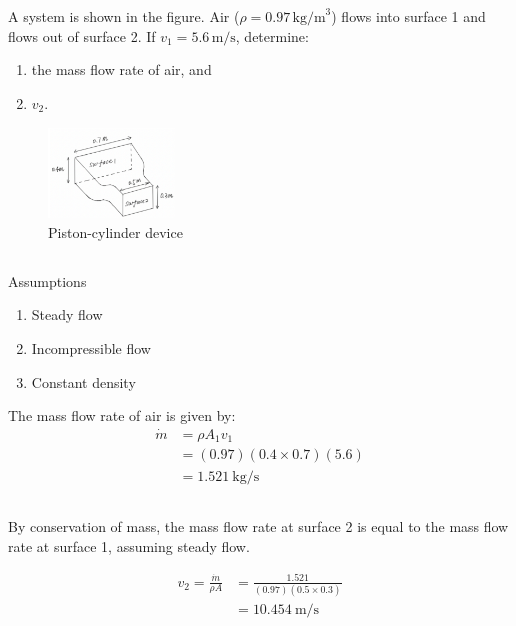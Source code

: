 \section{}
A system is shown in the figure. Air (\(\rho = 0.97 \, \text{kg/m}^3\)) flows into surface 1 and flows out of surface 2. 
If \(v_1 = 5.6 \, \text{m/s}\), determine:


\begin{enumerate}[label=(\alph*)]
    \item the mass flow rate of air, and
    \item \(v_2\).
\end{enumerate}

\begin{figure}[h]
    \centering
    \includegraphics[width=0.3\textwidth]{Questions/Figures/Q2ProblemDiagram.png}
    \caption{Piston-cylinder device}
    \label{fig:Q2ProblemDiagram}
\end{figure}

\subsection{}
Assumptions
\begin{enumerate}
    \item Steady flow
    \item Incompressible flow
    \item Constant density
\end{enumerate}


The mass flow rate of air is given by:
\begin{align}
    \dot{m} &= \rho A_1 v_1 \nonumber \\
    &= (0.97)(0.4\times0.7)(5.6) \nonumber \\
    &= \boxed{\qty{1.521}{\kilogram\per\second}} \nonumber
\end{align}

\subsection{}
By conservation of mass, the mass flow rate at surface 2 is equal to the mass flow rate at surface 1, assuming steady flow. 

\begin{align*}
    v_2 = \frac{\dot{m}}{\rho A} &= \frac{1.521}{(0.97)(0.5\times0.3)} \\
    &= \boxed{\qty{10.454}{\meter\per\second}}
\end{align*}


